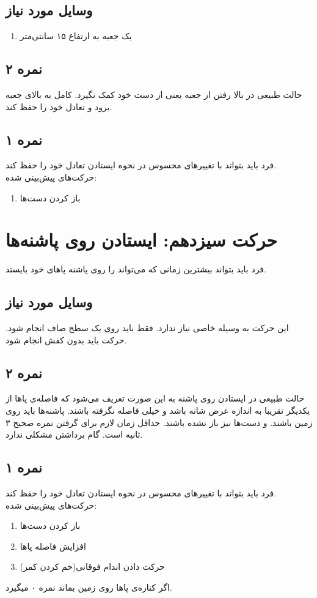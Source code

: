 \documentclass[12pt]{report}
\begin{document}
	\subsection*{وسایل مورد نیاز}
	\begin{enumerate}
		\item یک جعبه به ارتفاع ۱۵ سانتی‌متر
	\end{enumerate}
	\subsection*{نمره ۲}
	حالت طبیعی در بالا رفتن از جعبه یعنی از دست خود کمک نگیرد. کامل به بالای جعبه برود و تعادل خود را حفظ کند.
	\subsection*{نمره ۱}
	فرد باید بتواند با تغییر‌های محسوس در نحوه ایستادن تعادل خود را حفظ کند.\\
	حرکت‌های پیش‌بینی شده:
	\begin{enumerate}
		\item باز کردن دست‌ها
	\end{enumerate}
	\newpage
	
	\section*{حرکت سیزدهم: ایستادن روی پاشنه‌ها}
	فرد باید بتواند بیشترین زمانی که می‌تواند را روی پاشنه پاهای خود بایستد.
	\subsection*{وسایل مورد نیاز}
	این حرکت به وسیله خاصی نیاز ندارد. فقط باید روی یک سطح صاف انجام شود. حرکت باید بدون کفش انجام شود.
	\subsection*{نمره ۲}
	حالت طبیعی در ایستادن روی پاشنه به این صورت تعریف می‌شود که فاصله‌ی پاها از یکدیگر تقریبا به اندازه عرض شانه باشد و خیلی فاصله نگرفته باشند. پاشنه‌ها باید روی زمین باشند. و دست‌ها نیز باز نشده باشند. حداقل زمان لازم برای گرفتن نمره صحیح ۳ ثانیه است. گام برداشتن مشکلی ندارد.
	\subsection*{نمره ۱}
	فرد باید بتواند با تغییر‌های محسوس در نحوه ایستادن تعادل خود را حفظ کند.\\
	حرکت‌های پیش‌بینی شده:
	\begin{enumerate}
		\item باز کردن دست‌ها
		\item افزایش فاصله پاها
		\item حرکت دادن اندام فوقانی(خم کردن کمر)
	\end{enumerate}
	اگر کناره‌ی پاها روی زمین بماند نمره ۰ میگیرد.
	\newpage
	
\end{document}
